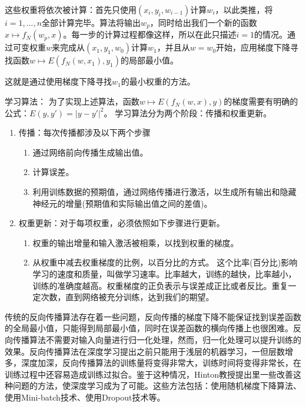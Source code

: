 这些权重将依次被计算：首先只使用$(x_i,y_i,w_{i-1})$计算$w_i$，以此类推，将$i = 1,...,n$全部计算完毕。算法将输出$w_p$，同时给出我们一个新的函数$x \mapsto f_N(w_p,x)$。每一步的计算过程都像这样，所以在此只描述$i = 1$的情况。通过可变权重$w$来完成从$(x_1,y_1,w_0)$计算$w_1$，并且从$w = w_0$开始，应用梯度下降寻找函数$w \mapsto E(f_N(w,x_1),y_1)$的局部最小值。

这就是通过使用梯度下降寻找$w_1$的最小权重的方法。

学习算法：
为了实现上述算法，函数$w \mapsto E(f_N(w,x),y)$的梯度需要有明确的公式：$E(y,{y}') = \left |y - {y}'  \right |^2$。
学习算法分为两个阶段：传播和权重更新。
\begin{enumerate}
    \item 传播：每次传播都涉及以下两个步骤
    \begin{enumerate}
        \item 通过网络前向传播生成输出值。
        \item 计算误差。
        \item 利用训练数据的预期值，通过网络传播进行激活，以生成所有输出和隐藏神经元的增量(预期值和实际输出值之间的差值)。
    \end{enumerate}
    \item 权重更新：对于每项权重，必须依照如下步骤进行更新。
    \begin{enumerate}
        \item 权重的输出增量和输入激活被相乘，以找到权重的梯度。
        \item 从权重中减去权重梯度的比例，以百分比的方式。
        这个比率(百分比)影响学习的速度和质量，叫做学习速率。比率越大，训练的越快，比率越小，训练的准确度越高。权重梯度的正负表示与误差成正比或者反比。重复一定次数，直到网络被充分训练，达到我们的期望。
    \end{enumerate}
\end{enumerate}

传统的反向传播算法存在着一些问题，反向传播的梯度下降不能保证找到误差函数的全局最小值，只能得到局部最小值，同时在误差函数的横向传播上也很困难。反向传播算法不需要对输入向量进行归一化处理，然而，归一化处理可以提升训练的效果。反向传播算法在深度学习提出之前只能用于浅层的机器学习，一但层数增多，深度加深，反向传播算法的训练量将变得非常大，训练时间将变得非常长，在训练过程中还容易造成训练过拟合。鉴于这种情况，Hinton教授提出里一些改善这种问题的方法，使深度学习成为了可能。这些方法包括：使用随机梯度下降算法、使用Mini-batch技术、使用Dropout技术等。

